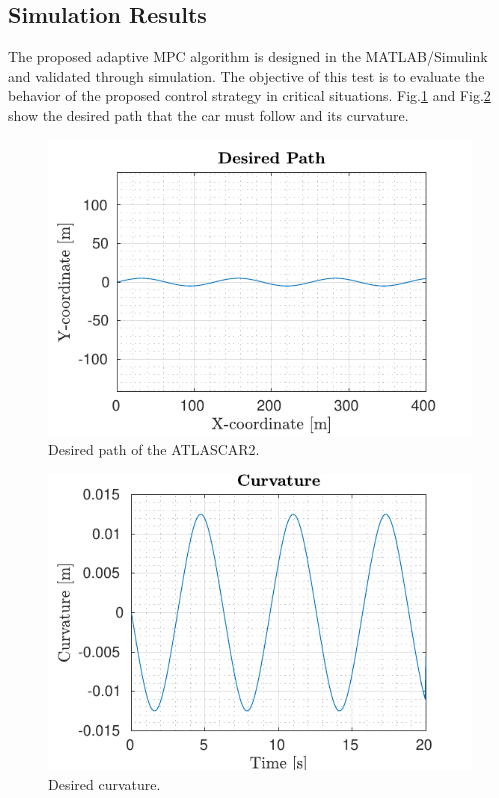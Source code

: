 \documentclass[conference, 11pt]{IEEEtran}
\begin{document}
\subsection{Simulation Results}
The proposed adaptive MPC algorithm is designed in the MATLAB/Simulink and validated through simulation. The objective of this
test is to evaluate the behavior of the proposed control strategy in critical situations. Fig.\ref{fig:reference_laneFollowing} and Fig.\ref{fig:curvature_laneFollowing} show the desired path that the car must follow and its curvature.
\begin{figure}[!h]
	\centering
	\includegraphics[width=1\columnwidth]{../../MATLAB/lane_following/figure/Reference.pdf}
	\caption{Desired path of the ATLASCAR2.}
	\label{fig:reference_laneFollowing}
\end{figure}
\begin{figure}[!h]
	\centering
	\includegraphics[width=1\columnwidth]{../../MATLAB/lane_following/figure/Curvature.pdf}
	\caption{Desired curvature.}
	\label{fig:curvature_laneFollowing}
\end{figure}
\end{document}
